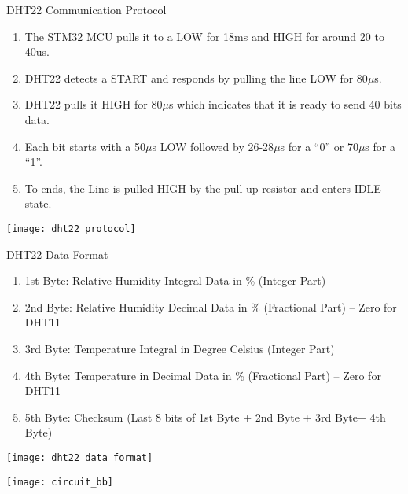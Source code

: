 \documentclass[aspectratio=169]{beamer}
\begin{document}
\begin{frame}{DHT22 Communication Protocol}
\begin{enumerate}

\item The STM32 MCU pulls it to a LOW for 18ms and HIGH for around 20 to 40us.
\item DHT22 detects a START and responds by pulling the line LOW for 80$\mu$s.
\item DHT22 pulls it HIGH for 80$\mu$s which indicates that it is ready to send 40 bits  data.
\item Each bit starts with a 50$\mu$s LOW followed by 26-28$\mu$s for a ``0'' or 70$\mu$s for a ``1''.
\item To ends, the Line is pulled HIGH by the pull-up resistor and enters IDLE state.

\end{enumerate}

\centering
\texttt{[image: dht22\_protocol]}
\end{frame}


\begin{frame}{DHT22 Data Format}
\begin{enumerate}

\item 1st Byte: Relative Humidity Integral Data in \% (Integer Part)
\item 2nd Byte: Relative Humidity Decimal Data in \% (Fractional Part) – Zero for DHT11
\item 3rd Byte: Temperature Integral in Degree Celsius (Integer Part)
\item 4th Byte: Temperature in Decimal Data in \% (Fractional Part) – Zero for DHT11
\item 5th Byte: Checksum (Last 8 bits of {1st Byte + 2nd Byte + 3rd Byte+ 4th Byte})

\end{enumerate}

\centering
\texttt{[image: dht22\_data\_format]}
\end{frame}



\begin{frame}{}
\hspace*{1cm}
\texttt{[image: circuit\_bb]}
\end{frame}
\end{document}
